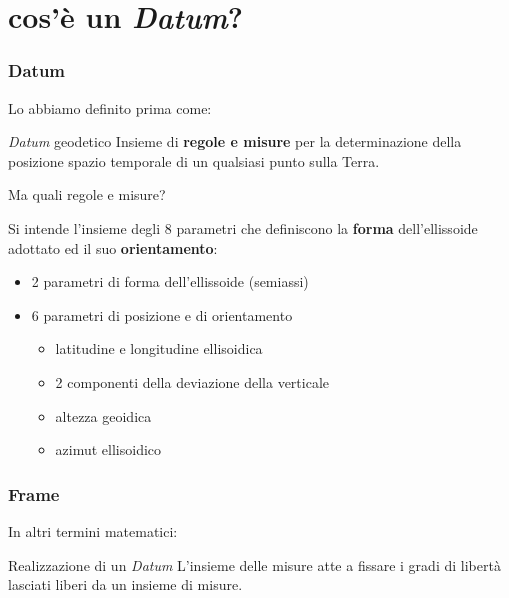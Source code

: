 \documentclass{beamer}
\begin{document}
{\begin{frame}
\end{frame}

\section{cos'è un \textit{Datum}?}

\begin{frame}
   \frametitle{Datum}

   Lo abbiamo definito prima come:
   
   \begin{block}{\textit{Datum} geodetico}
       {\scriptsize Insieme di \textbf{regole e misure} per la determinazione della posizione
       spazio temporale di un qualsiasi punto sulla Terra.\\}
   \end{block}

   Ma quali regole e misure?
   
   \begin{block}{}
      Si intende l'insieme degli 8 parametri che definiscono la \textbf{forma}
      dell'ellissoide adottato ed il suo \textbf{orientamento}:
      \begin{itemize}
		\item {\scriptsize 2 parametri di forma dell'ellissoide (semiassi)}
		\item {\scriptsize 6 parametri di posizione e di orientamento}
		\begin{itemize}
			\item {\scriptsize latitudine e longitudine ellisoidica}
			\item {\scriptsize 2 componenti della deviazione della verticale}
            \item {\scriptsize altezza geoidica}
			\item {\scriptsize azimut ellisoidico}
		\end{itemize}
	\end{itemize}
   \end{block}

\end{frame}

\begin{frame}
    \frametitle{Frame}
    
    In altri termini matematici:
    
    \begin{block}{Realizzazione di un \textit{Datum}}
        L'insieme delle misure atte a fissare i gradi di libertà lasciati liberi
        da un insieme di misure.
    \end{block}


\end{frame}}
\end{document}
